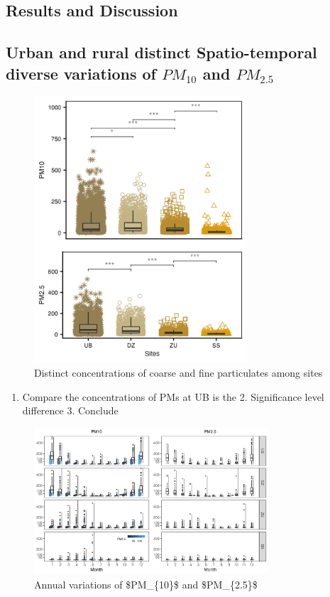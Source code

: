 \documentclass[
  11pt,
]{article}
\providecommand{\tightlist}{%
  \setlength{\itemsep}{0pt}\setlength{\parskip}{0pt}}
\begin{document}
\newpage

\subsection{Results and Discussion}\label{results-and-discussion}

\newpage
\subsection{Urban and rural distinct Spatio-temporal diverse variations of $PM_{10}$ and $PM_{2.5}$}

\begin{figure}
\centering
\includegraphics[width=3.125in,height=\textheight,keepaspectratio]{images/figure_3.png}
\caption{Distinct concentrations of coarse and fine particulates among
sites}
\end{figure}

\begin{enumerate}
\def\labelenumi{\arabic{enumi}.}
\tightlist
\item
  Compare the concentrations of PMs at UB is the 2. Significance level
  difference 3. Conclude
\end{enumerate}

\newpage

\begin{figure}
\centering
\includegraphics[width=3.4375in,height=\textheight,keepaspectratio]{images/figure_4.png}
\caption{Annual variations of \$PM\_\{10\}\$ and \$PM\_\{2.5\}\$}
\end{figure}
\end{document}
